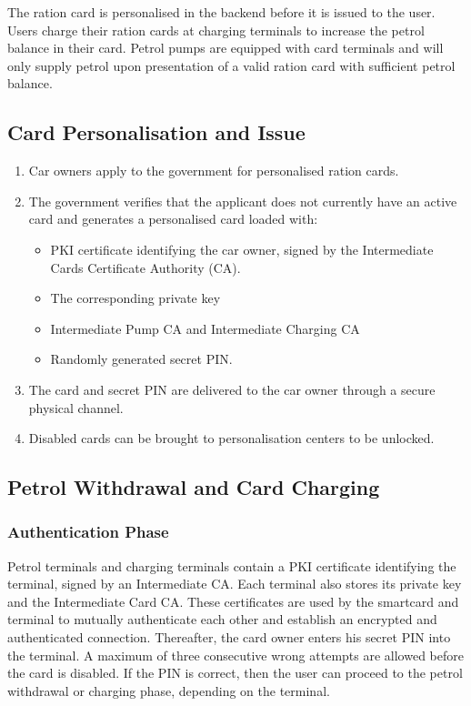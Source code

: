 The ration card is personalised in the backend before it is issued to the user. Users charge their ration cards at charging terminals to increase the petrol balance in their card. Petrol pumps are equipped with card terminals and will only supply petrol upon presentation of a valid ration card with sufficient petrol balance.

\subsection{Card Personalisation and Issue}

\begin{enumerate}
  \item Car owners apply to the government for personalised ration cards.
  \item The government verifies that the applicant does not currently have an active card and generates a personalised card loaded with: 
	\begin{itemize}
	  \item PKI certificate identifying the car owner, signed by the Intermediate Cards Certificate Authority (CA).
	  \item The corresponding private key
	  \item Intermediate Pump CA and Intermediate Charging CA
	  \item Randomly generated secret PIN.
	\end{itemize}
  \item The card and secret PIN are delivered to the car owner through a secure physical channel.
  \item Disabled cards can be brought to personalisation centers to be unlocked.
\end{enumerate}

\subsection{Petrol Withdrawal and Card Charging}
\subsubsection{Authentication Phase}
Petrol terminals and charging terminals contain a PKI certificate identifying the terminal, signed by an Intermediate CA. Each terminal also stores its private key and the Intermediate Card CA. These certificates are used by the smartcard and terminal to mutually authenticate each other and establish an encrypted and authenticated connection. Thereafter, the card owner enters his secret PIN into the terminal. A maximum of three consecutive wrong attempts are allowed before the card is disabled. If the PIN is correct, then the user can proceed to the petrol withdrawal or charging phase, depending on the terminal.

